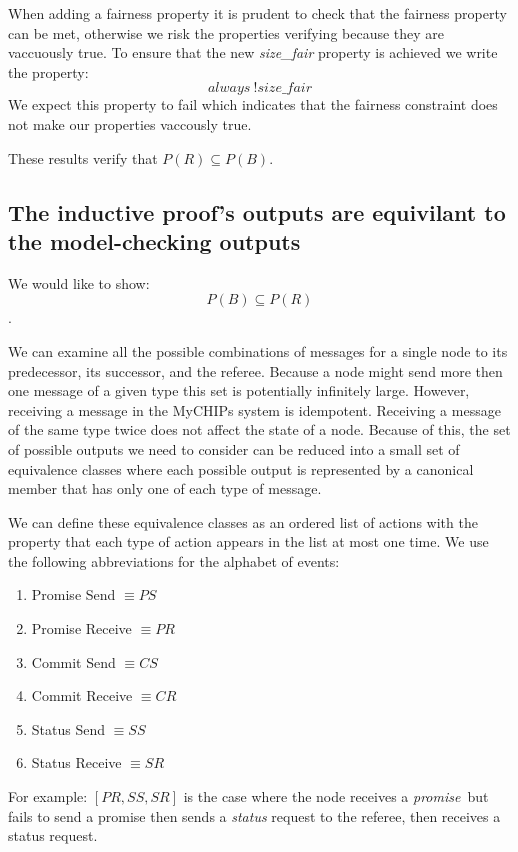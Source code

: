 \documentclass[runningheads]{llncs}
\newcommand{\promise}{\emph{promise}}
\begin{document}
When adding a fairness property it is prudent to check that the fairness property can be met, otherwise we risk the properties verifying because they are vaccuously true. To ensure that the new \emph{size\_fair} property is achieved we write the property:
$$always\ !size\_fair$$
We expect this property to fail which indicates that the fairness constraint does not make our properties vaccously true. 

These results verify that 
$P(R) \subseteq P(B)$. 

\subsection{The inductive proof's outputs are equivilant to the model-checking outputs}
\label{sec:outputs_bigger}
We would like to show:
$$P(B) \subseteq P(R)$$. 

We can examine all the possible combinations of messages for a single node to its predecessor, its successor, and the referee. Because a node might send more then one message of a given type this set is potentially infinitely large. However, receiving a message in the MyCHIPs system is idempotent. Receiving a message of the same type twice does not affect the state of a node. Because of this, the set of possible outputs we need to consider can be reduced into a small set of equivalence classes where each possible output is represented by a canonical member that has only one of each type of message.

We can define these equivalence classes as an ordered list of actions with the property that each type of action appears in the list at most one time. 
We use the following abbreviations for the alphabet of events: 
\begin{enumerate}
    \item Promise Send $\equiv PS$
    \item Promise Receive $\equiv PR$
    \item Commit Send $\equiv CS$
    \item Commit Receive $\equiv CR$
    \item Status Send $\equiv SS$
    \item Status Receive $\equiv SR$
\end{enumerate}
For example: $[PR, SS, SR]$ is the case where the node receives a \promise\ but fails to send a promise then sends a \emph{status} request to the referee, then receives a status request.
\end{document}
